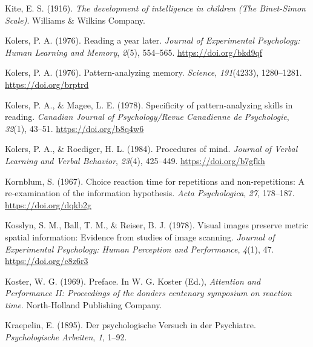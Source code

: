 \documentclass[
  oneside,
  12pt]{crumpbook}
\newlength{\cslhangindent}
\newlength{\cslentryspacingunit} %
\newenvironment{CSLReferences}[2] %
 {%
  \setlength{\parindent}{0pt}
  \ifodd #1
  \let\oldpar\par
  \def\par{\hangindent=\cslhangindent\oldpar}
  \fi
  \setlength{\parskip}{#2\cslentryspacingunit}
 }%
 {}
\begin{document}
\begin{CSLReferences}{1}{0}
\leavevmode{}%
Kite, E. S. (1916). \emph{The development of intelligence in children ({The Binet}-{Simon Scale})}. {Williams \& Wilkins Company}.

\leavevmode{}%
Kolers, P. A. (1976). Reading a year later. \emph{Journal of Experimental Psychology: Human Learning and Memory}, \emph{2}(5), 554--565. \url{https://doi.org/bkd9qf}

\leavevmode{}%
Kolers, P. A. (1976). Pattern-analyzing memory. \emph{Science}, \emph{191}(4233), 1280--1281. \url{https://doi.org/brptrd}

\leavevmode{}%
Kolers, P. A., \& Magee, L. E. (1978). Specificity of pattern-analyzing skills in reading. \emph{Canadian Journal of Psychology/Revue Canadienne de Psychologie}, \emph{32}(1), 43--51. \url{https://doi.org/b8q4w6}

\leavevmode{}%
Kolers, P. A., \& Roediger, H. L. (1984). Procedures of mind. \emph{Journal of Verbal Learning and Verbal Behavior}, \emph{23}(4), 425--449. \url{https://doi.org/b7gfkh}

\leavevmode{}%
Kornblum, S. (1967). Choice reaction time for repetitions and non-repetitions: {A} re-examination of the information hypothesis. \emph{Acta Psychologica}, \emph{27}, 178--187. \url{https://doi.org/dqkb2g}

\leavevmode{}%
Kosslyn, S. M., Ball, T. M., \& Reiser, B. J. (1978). Visual images preserve metric spatial information: Evidence from studies of image scanning. \emph{Journal of Experimental Psychology: Human Perception and Performance}, \emph{4}(1), 47. \url{https://doi.org/c8z6r3}

\leavevmode{}%
Koster, W. G. (1969). Preface. In W. G. Koster (Ed.), \emph{Attention and {Performance II}: Proceedings of the donders centenary symposium on reaction time}. {North-Holland Publishing Company}.

\leavevmode{}%
Kraepelin, E. (1895). Der psychologische {Versuch} in der {Psychiatre}. \emph{Psychologische Arbeiten}, \emph{1}, 1--92.


\end{CSLReferences}
\end{document}
